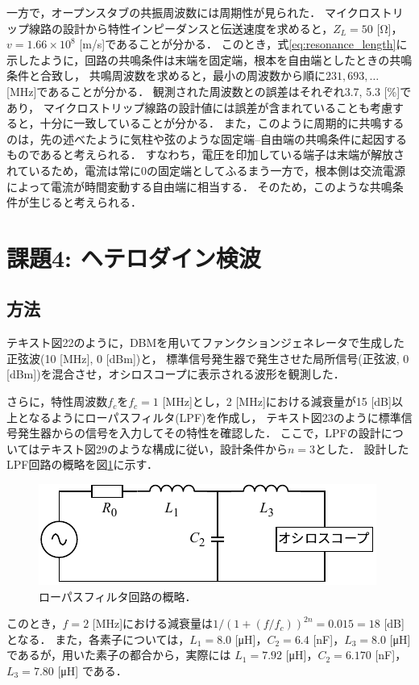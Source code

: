 \documentclass[uplatex,dvipdfmx,a4j,12pt]{jsarticle}
\begin{document}
一方で，オープンスタブの共振周波数には周期性が見られた．
マイクロストリップ線路の設計から特性インピーダンスと伝送速度を求めると，$Z_L = 50$ [\si{\ohm}]，$v = 1.66\times 10^8$ [m/s]であることが分かる．
このとき，式\eqref{eq:resonance_length}に示したように，回路の共鳴条件は末端を固定端，根本を自由端としたときの共鳴条件と合致し，
共鳴周波数を求めると，最小の周波数から順に$231, 693, \dots$ [MHz]であることが分かる．
観測された周波数との誤差はそれぞれ3.7, 5.3 [\%]であり，
マイクロストリップ線路の設計値には誤差が含まれていることも考慮すると，十分に一致していることが分かる．
また，このように周期的に共鳴するのは，先の述べたように気柱や弦のような固定端--自由端の共鳴条件に起因するものであると考えられる．
すなわち，電圧を印加している端子は末端が解放されているため，電流は常に0の固定端としてふるまう一方で，根本側は交流電源によって電流が時間変動する自由端に相当する．
そのため，このような共鳴条件が生じると考えられる．

\section{課題4: ヘテロダイン検波}
\subsection{方法}
テキスト図22のように，DBMを用いてファンクションジェネレータで生成した正弦波(10 [MHz], 0 [dBm])と，
標準信号発生器で発生させた局所信号(正弦波, 0 [dBm])を混合させ，オシロスコープに表示される波形を観測した．

さらに，特性周波数$f_c$を$f_c = 1$ [MHz]とし，2 [MHz]における減衰量が15 [dB]以上となるようにローパスフィルタ(LPF)を作成し，
テキスト図23のように標準信号発生器からの信号を入力してその特性を確認した．
ここで，LPFの設計についてはテキスト図29のような構成に従い，設計条件から$n = 3$とした．
設計したLPF回路の概略を図\ref{fig:4-circuit}に示す．
\begin{figure}[H]
    \centering
    \includegraphics[width=0.7\linewidth]{img/LPF.pdf}
    \caption{ローパスフィルタ回路の概略．}
    \label{fig:4-circuit}
\end{figure}
このとき，$f = 2$ [MHz]における減衰量は$1/(1 + (f/f_c))^{2n} = 0.015 = 18$ [dB]となる．
また，各素子については，$L_1  = 8.0$ [\si{\micro \henry}]，$C_2 = 6.4$ [\si{\nano \farad}]，$L_3 = 8.0$ [\si{\micro \henry}]であるが，用いた素子の都合から，実際には
$L_1  = 7.92$ [\si{\micro \henry}]，$C_2 = 6.170$ [\si{\nano \farad}]，$L_3 = 7.80$ [\si{\micro \henry}]
である．
\end{document}
